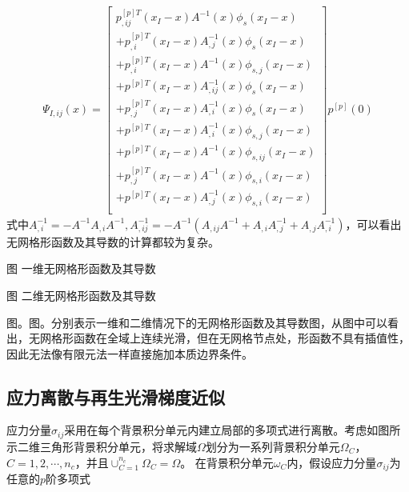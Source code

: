 \begin{equation}
\begin{split}
    \Psi_{I,ij}(x)=\left[\begin{matrix}
    p_{,ij}^{[p]T}(x_I-x)A^{-1}(x)\phi_s(x_I-x)\\
    +p_{,i}^{[p]T}(x_I-x)A_{,j}^{-1}(x)\phi_s(x_I-x)\\
    +p_{,i}^{[p]T}(x_I-x)A^{-1}(x)\phi_{s,j}(x_I-x)\\
    +p^{[p]T}(x_I-x)A_{,ij}^{-1}(x)\phi_s(x_I-x)\\
    +p_{,j}^{[p]T}(x_I-x)A_{,i}^{-1}(x)\phi_s(x_I-x)\\
    +p^{[p]T}(x_I-x)A_{,i}^{-1}(x)\phi_{s,j}(x_I-x)\\
    +p^{[p]T}(x_I-x)A^{-1}(x)\phi_{s,ij}(x_I-x)\\
    +p_{,j}^{[p]T}(x_I-x)A^{-1}(x)\phi_{s,i}(x_I-x)\\
    +p^{[p]T}(x_I-x)A_{,j}^{-1}(x)\phi_{s,i}(x_I-x)\\
    \end{matrix}\right]
    p^{[p]}(0)
\end{split}
\end{equation}
式中$A_{,i}^{-1}=-A^{-1}A_{,i}A^{-1},A_{,ij}^{-1}=-A^{-1}(A_{,ij}A^{-1}+A_{,i}A_{,j}^{-1}+A_{,j}A_{,i}^{-1})$，可以看出无网格形函数及其导数的计算都较为复杂。\par
图 一维无网格形函数及其导数\\\par
图 二维无网格形函数及其导数\par
图。图。分别表示一维和二维情况下的无网格形函数及其导数图，从图中可以看出，无网格形函数在全域上连续光滑，但在无网格节点处，形函数不具有插值性，因此无法像有限元法一样直接施加本质边界条件。
\subsection{应力离散与再生光滑梯度近似}
应力分量$\sigma_{ij}$采用在每个背景积分单元内建立局部的多项式进行离散。考虑如图所示二维三角形背景积分单元，将求解域$\Omega$划分为一系列背景积分单元$\Omega_C$，$C=1,2,\dotsb,n_c$，并且$\cup_{C=1}^{n_c}\Omega_C=\Omega$。
在背景积分单元$\omega_C$内，假设应力分量$\sigma_{ij}$为任意的$p$阶多项式